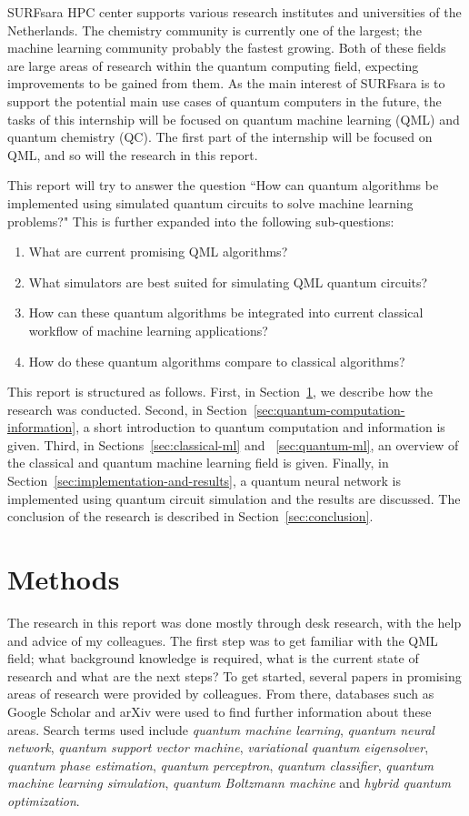 \documentclass[a4paper,10pt]{article}
\begin{document}
SURFsara HPC center supports various research institutes and universities of the Netherlands.
The chemistry community is currently one of the largest; the machine learning community probably the fastest growing.
Both of these fields are large areas of research within the quantum computing field, expecting improvements to be gained from them.
As the main interest of SURFsara is to support the potential main use cases of quantum computers in the future, the tasks of this internship will be focused on quantum machine learning (QML) and quantum chemistry (QC).
The first part of the internship will be focused on QML, and so will the research in this report.

This report will try to answer the question ``How can quantum algorithms be implemented using simulated quantum circuits to solve machine learning problems?"
This is further expanded into the following sub-questions:
\begin{enumerate}
	\item What are current promising QML algorithms?
	\item What simulators are best suited for simulating QML quantum circuits?
	\item How can these quantum algorithms be integrated into current classical workflow of machine learning applications?
	\item How do these quantum algorithms compare to classical algorithms?
\end{enumerate}

This report is structured as follows. First, in Section~\ref{sec:methods}, we describe how the research was conducted.
Second, in Section~\ref{sec:quantum-computation-information}, a short introduction to quantum computation and information is given.
Third, in Sections~\ref{sec:classical-ml} and ~\ref{sec:quantum-ml}, an overview of the classical and quantum machine learning field is given.
Finally, in Section~\ref{sec:implementation-and-results}, a quantum neural network is implemented using quantum circuit simulation and the results are discussed.
The conclusion of the research is described in Section~\ref{sec:conclusion}.

\section{Methods} \label{sec:methods}
The research in this report was done mostly through desk research, with the help and advice of my colleagues.
The first step was to get familiar with the QML field; what background knowledge is required, what is the current state of research and what are the next steps?
To get started, several papers in promising areas of research were provided by colleagues. 
From there, databases such as Google Scholar and arXiv were used to find further information about these areas.
Search terms used include \emph{quantum machine learning}, \emph{quantum neural network}, \emph{quantum support vector machine}, \emph{variational quantum eigensolver}, \emph{quantum phase estimation}, \emph{quantum perceptron}, \emph{quantum classifier}, \emph{quantum machine learning simulation}, \emph{quantum Boltzmann machine} and \emph{hybrid quantum optimization}.
\end{document}

